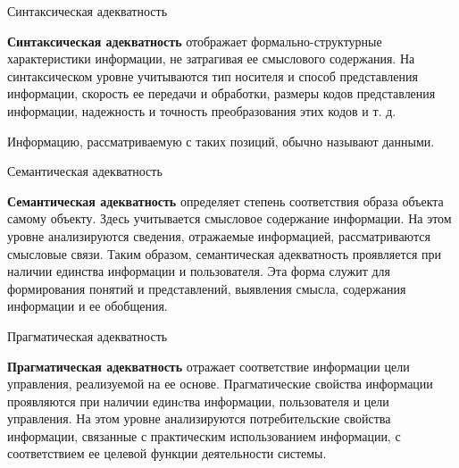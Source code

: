 \documentclass[10pt,pdf,hyperref={unicode}]{beamer}
\begin{document}
\begin{frame}{Синтаксическая адекватность}

\textbf{Синтаксическая адекватность} отображает формально-структурные характеристики информации, не затрагивая ее смыслового содержания. 
На синтаксическом уровне учитываются тип носителя и способ представления информации, 
скорость ее передачи и обработки, размеры кодов представления информации, 
надежность и точность преобразования этих кодов и т. д.

Информацию, рассматриваемую с таких позиций, обычно называют данными.

\end{frame}

\begin{frame}{Семантическая адекватность}

\textbf{Семантическая адекватность} определяет степень соответствия образа объекта самому объекту. 
Здесь учитывается смысловое содержание информации. На этом уровне анализируются сведения, отражаемые информацией, 
рассматриваются смысловые связи. 
Таким образом, семантическая адекватность проявляется при наличии единства информации и пользователя. 
Эта форма служит для формирования понятий и представлений, выявления смысла, содержания информации и ее обобщения.

\end{frame}

\begin{frame}{Прагматическая адекватность}

\textbf{Прагматическая адекватность} отражает соответствие информации цели управления, реализуемой на ее основе. 
Прагматические свойства информации проявляются при наличии единcтва информации, пользователя и цели управления. 
На этом уровне анализируются потребительские свойства информации, связанные с практическим использованием информации, 
с соответствием ее целевой функции деятельности системы.

\end{frame}
\end{document}
